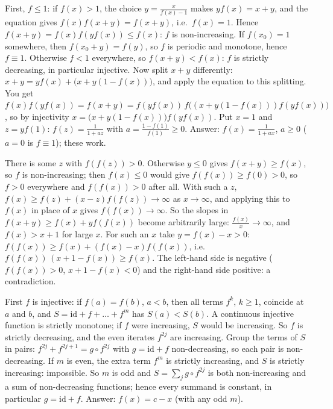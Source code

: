 \documentclass[11pt,a4paper]{article}
\begin{document}

 First, \(f\le1\): if \(f(x)>1\), the choice \(y=\frac x{f(x)-1}\) makes \(yf(x)=x+y\), and the equation gives \(f(x)f(x+y)=f(x+y)\), i.e.\ \(f(x)=1\). Hence \(f(x+y)=f(x)f(yf(x))\le f(x)\): \(f\) is non-increasing. If \(f(x_0)=1\) somewhere, then \(f(x_0+y)=f(y)\), so \(f\) is periodic and monotone, hence \(f\equiv1\).
 Otherwise \(f\lt1\) everywhere, so \(f(x+y)\lt f(x)\): \(f\) is strictly decreasing, in particular injective. Now split \(x+y\) differently: \(x+y=yf(x)+\bigl(x+y(1-f(x))\bigr)\), and apply the equation to this splitting.
 You get \(f(x)f(yf(x))=f(x+y)=f(yf(x))\,f\bigl((x+y(1-f(x)))f(yf(x))\bigr)\), so by injectivity \(x=\bigl(x+y(1-f(x))\bigr)f(yf(x))\). Put \(x=1\) and \(z=yf(1)\): \(f(z)=\frac1{1+az}\) with \(a=\frac{1-f(1)}{f(1)}\ge0\). Answer: \(f(x)=\frac1{1+ax}\), \(a\ge0\) (\(a=0\) is \(f\equiv1\)); these work.

 There is some \(z\) with \(f(f(z))\gt0\). Otherwise \(y\le0\) gives \(f(x+y)\ge f(x)\), so \(f\) is non-increasing; then \(f(x)\le0\) would give \(f(f(x))\ge f(0)\gt0\), so \(f\gt0\) everywhere and \(f(f(x))\gt0\) after all.
 With such a \(z\), \(f(x)\ge f(z)+(x-z)f(f(z))\to\infty\) as \(x\to\infty\), and applying this to \(f(x)\) in place of \(x\) gives \(f(f(x))\to\infty\). So the slopes in \(f(x+y)\ge f(x)+yf(f(x))\) become arbitrarily large: \(\frac{f(x)}x\to\infty\), and \(f(x)\gt x+1\) for large \(x\).
 For such an \(x\) take \(y=f(x)-x\gt0\): \(f(f(x))\ge f(x)+(f(x)-x)f(f(x))\), i.e.\ \(f(f(x))\,(x+1-f(x))\ge f(x)\). The left-hand side is negative (\(f(f(x))\gt0\), \(x+1-f(x)\lt0\)) and the right-hand side positive: a contradiction.

 First \(f\) is injective: if \(f(a)=f(b)\), \(a\lt b\), then all terms \(f^k\), \(k\ge1\), coincide at \(a\) and \(b\), and \(S=\mathrm{id}+f+\dots+f^m\) has \(S(a)\lt S(b)\). A continuous injective function is strictly monotone; if \(f\) were increasing, \(S\) would be increasing. So \(f\) is strictly decreasing, and the even iterates \(f^{2j}\) are increasing.
 Group the terms of \(S\) in pairs: \(f^{2j}+f^{2j+1}=g\circ f^{2j}\) with \(g=\mathrm{id}+f\) non-decreasing, so each pair is non-decreasing. If \(m\) is even, the extra term \(f^m\) is strictly increasing, and \(S\) is strictly increasing: impossible.
 So \(m\) is odd and \(S=\sum_jg\circ f^{2j}\) is both non-increasing and a sum of non-decreasing functions; hence every summand is constant, in particular \(g=\mathrm{id}+f\). Answer: \(f(x)=c-x\) (with any odd \(m\)).
\end{document}

